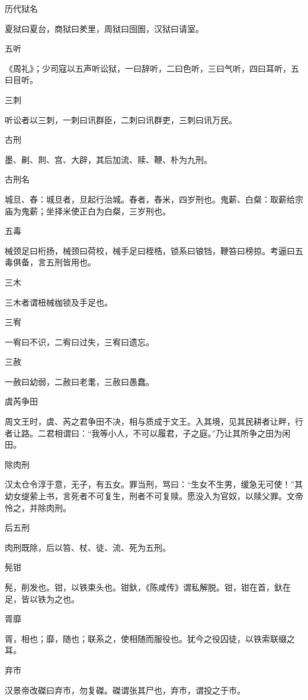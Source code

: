 \documentclass[a4paper,12pt,UTF8,twoside]{ctexbook}
\begin{document}
    历代狱名
    
    夏狱曰夏台，商狱曰羑里，周狱曰囹圄，汉狱曰请室。
    
    五听
    
    《周礼》；少司寇以五声听讼狱，一曰辞听，二曰色听，三曰气听，四曰耳听，五曰目听。
    
    三刺
    
    听讼者以三刺，一刺曰讯群臣，二刺曰讯群吏，三刺曰讯万民。
    
    古刑
    
    墨、劓、剕、宫、大辟，其后加流、赎、鞭、朴为九刑。
    
    古刑名
    
    城旦、舂：城旦者，旦起行治城。舂者，舂米，四岁刑也。鬼薪、白粲：取薪给宗庙为鬼薪；坐择米使正白为白粲，三岁刑也。
    
    五毒
    
    械颈足曰桁扬，械颈曰荷校，械手足曰桎梏，锁系曰锒铛，鞭笞曰榜掠。考逼曰五毒俱备，言五刑皆用也。
    
    三木
    
    三木者谓杻械枷锁及手足也。
    
    三宥
    
    一宥曰不识，二宥曰过失，三宥曰遗忘。
    
    三赦
    
    一赦曰幼弱，二赦曰老耄，三赦曰愚蠢。
    
    虞芮争田
    
    周文王时，虞、芮之君争田不决，相与质成于文王。入其境，见其民耕者让畔，行者让路。二君相谓曰：“我等小人，不可以履君，子之庭。”乃让其所争之田为闲田。
    
    除肉刑
    
    汉太仓令淳于意，无子，有五女。罪当刑，骂曰：“生女不生男，缓急无可使！”其幼女缇萦上书，言死者不可复生，刑者不可复赎。愿没入为官奴，以赎父罪。文帝怜之，并除肉刑。
    
    后五刑
    
    肉刑既除，后以笞、杖、徒、流、死为五刑。
    
    髡钳
    
    髡，削发也。钳，以铁束头也。钳釱，《陈咸传》谓私解脱。钳，钳在首，釱在足，皆以铁为之也。
    
    胥靡
    
    胥，相也；靡，随也；联系之，使相随而服役也。犹今之役囚徒，以铁索联缀之耳。
    
    弃市
    
    汉景帝改磔曰弃市，勿复磔。磔谓张其尸也，弃市，谓投之于市。
    
\end{document}
